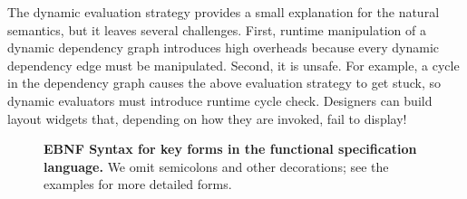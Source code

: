 The dynamic evaluation strategy provides a small explanation for the natural semantics, but it leaves several challenges. First, runtime manipulation of a dynamic dependency graph introduces high overheads because every dynamic dependency edge must be manipulated. Second, it is unsafe. For example, a cycle in the dependency graph causes the above evaluation strategy to get stuck, so dynamic evaluators must introduce runtime cycle check. Designers can build layout widgets that, depending on how they are invoked, fail to display!





\begin{figure}
\renewcommand{\litleft}{\bfseries}
\renewcommand{\ulitleft}{\bfseries}
\renewcommand{\superscript}[1]{\ensuremath{^{\textrm{#1}}}}
\renewcommand{\subscript}[1]{\ensuremath{_{\textrm{\uppercase{#1}}}}}
\renewcommand{\syntleft}{\normalfont\itshape\texttt{<}}
\renewcommand{\syntright}{\texttt{>}}
\caption{\textbf{EBNF Syntax for key forms in the functional specification language.} We omit semicolons and other decorations; see the examples for more detailed forms.}
\label{fig:coresyntax}
\end{figure}


